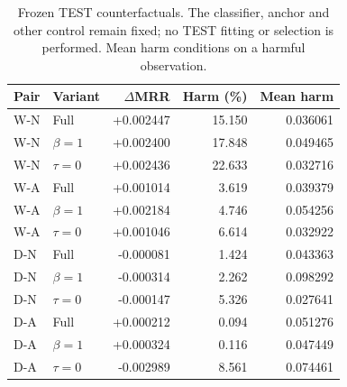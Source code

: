 \begin{table}[htbp]
\centering\small
\caption{Frozen TEST counterfactuals. The classifier, anchor and other control remain fixed; no TEST fitting or selection is performed. Mean harm conditions on a harmful observation.}
\label{tab:rerun-ablation}
\begin{tabular}{llrrr}
\toprule
Pair & Variant & $\Delta$MRR & Harm (\%) & Mean harm\\
\midrule
W-N & Full & +0.002447 & 15.150 & 0.036061\\
W-N & $\beta=1$ & +0.002400 & 17.848 & 0.049465\\
W-N & $\tau=0$ & +0.002436 & 22.633 & 0.032716\\
W-A & Full & +0.001014 & 3.619 & 0.039379\\
W-A & $\beta=1$ & +0.002184 & 4.746 & 0.054256\\
W-A & $\tau=0$ & +0.001046 & 6.614 & 0.032922\\
D-N & Full & -0.000081 & 1.424 & 0.043363\\
D-N & $\beta=1$ & -0.000314 & 2.262 & 0.098292\\
D-N & $\tau=0$ & -0.000147 & 5.326 & 0.027641\\
D-A & Full & +0.000212 & 0.094 & 0.051276\\
D-A & $\beta=1$ & +0.000324 & 0.116 & 0.047449\\
D-A & $\tau=0$ & -0.002989 & 8.561 & 0.074461\\
\bottomrule
\end{tabular}
\end{table}
